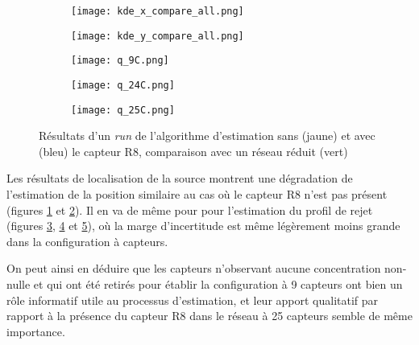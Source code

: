 \begin{figure}[h!]
	\centering
	\begin{subfigure}[t]{0.5\textwidth}
		\centering
		\texttt{[image: kde\_x\_compare\_all.png]}
		\caption{}
		\label{kde_x_all}
	\end{subfigure}%
	\begin{subfigure}[t]{0.5\textwidth}
		\centering
		\texttt{[image: kde\_y\_compare\_all.png]}
		\caption{}
		\label{kde_y_all}
	\end{subfigure}
	\begin{subfigure}[t]{0.33\textwidth}
		\centering
		\texttt{[image: q\_9C.png]}
		\caption{}
		\label{q_9C}
	\end{subfigure}%
	\begin{subfigure}[t]{0.33\textwidth}
		\centering
		\texttt{[image: q\_24C.png]}
		\caption{}
		\label{q_24C}
	\end{subfigure}%
	\begin{subfigure}[t]{0.33\textwidth}
		\centering
		\texttt{[image: q\_25C.png]}
		\caption{}
		\label{q_25C}
	\end{subfigure}
	\caption{Résultats d'un \textit{run} de l'algorithme d'estimation sans (jaune) et avec (bleu) le capteur R8, comparaison avec un réseau réduit (vert)}
	\label{}
\end{figure}



Les résultats de  localisation de la source montrent une dégradation de l'estimation de la position similaire au cas où le capteur R8 n'est pas présent (figures \ref{kde_x_all} et \ref{kde_y_all}). Il en va de même pour pour l'estimation du profil de rejet (figures \ref{q_9C}, \ref{q_24C} et \ref{q_25C}), où la marge d'incertitude est même légèrement moins grande dans la configuration à capteurs. 

On peut ainsi en déduire que les capteurs n'observant aucune concentration  non-nulle et qui ont été retirés pour établir la configuration à 9 capteurs ont bien un rôle informatif utile au processus d'estimation, et leur apport qualitatif par rapport à la présence du capteur R8 dans le réseau à 25 capteurs semble de même importance.\\

